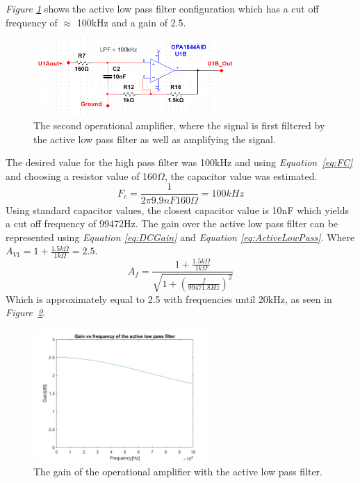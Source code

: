 \vspace{4cm}

\textit{Figure \ref{fig:Opamp2}} shows the active low pass filter configuration which has a cut off frequency of $\approx$ 100kHz and a gain of 2.5.

\begin{figure}[h]
    \centering
    \includegraphics[width=0.7\textwidth]{graphics/OPamp2.png}
    \caption{The second operational amplifier, where the signal is first filtered by the active low pass filter as well as amplifying the signal.}
    \label{fig:Opamp2}
\end{figure}

The desired value for the high pass filter was 100kHz and using \textit{Equation~\ref{eq:FC}} and choosing a resistor value of 160$\Omega$, the capacitor value was estimated.   
$$F_c = \frac{1}{2\pi 9.9nF 160\Omega} = 100kHz$$
Using standard capacitor values, the closest capacitor value is 10nF which yields a cut off frequency of 99472Hz.
The gain over the active low pass filter can be represented using \textit{Equation \ref{eq:DCGain}} and \textit{Equation \ref{eq:ActiveLowPass}}. 
Where $A_{V1} = 1 + \frac{1.5k\Omega}{1k\Omega} = 2.5$.
$$A_f  = \frac{1 + \frac{1.5k\Omega}{1k\Omega}}{\sqrt{1 + (\frac{f}{99471.8Hz})^2}}$$
Which is approximately equal to 2.5 with frequencies until 20kHz, as seen in 
\textit{Figure~\ref{fig:AVlowpass}}.

\begin{figure}[h]
    \centering
    \includegraphics[width=0.6\textwidth]{graphics/Av_Lowpass.png}
    \caption{The gain of the operational amplifier with the active low pass filter.}
    \label{fig:AVlowpass}
\end{figure}


